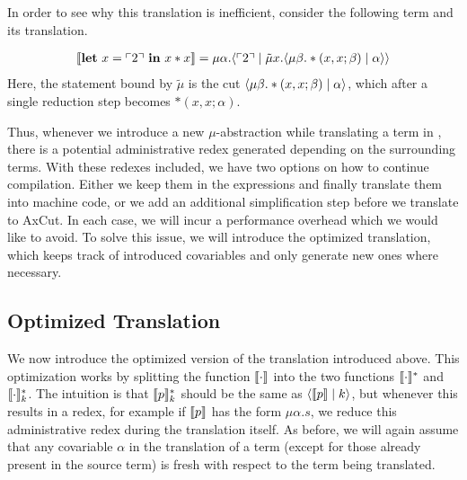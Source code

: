 In order to see why this translation is inefficient, consider the following term and its translation.
\begin{example}
  \label{ex:translation:naive}
  \begin{align*}
    \llbracket \mathbf{let}\ x = \ulcorner 2 \urcorner\ \mathbf{in}\ x*x \rrbracket = \mu\alpha.\langle \ulcorner 2 \urcorner \mid \tilde\mu x.\langle \mu\beta.*(x,x;\beta) \mid \alpha \rangle \rangle
  \end{align*}
  Here, the statement bound by $\tilde\mu$ is the cut $\langle \mu\beta.*(x,x;\beta) \mid \alpha \rangle$, which after a single reduction step becomes $*(x,x;\alpha)$.
\end{example}
Thus, whenever we introduce a new $\mu$-abstraction while translating a term in \surfacelang{}, there is a potential administrative redex generated  depending on the surrounding terms.
With these redexes included, we have two options on how to continue compilation.
Either we keep them in the expressions and finally translate them into machine code, or we add an additional simplification step before we translate \targetlang{} to AxCut.
In each case, we will incur a performance overhead which we would like to avoid.
To solve this issue, we will introduce the optimized translation, which keeps track of introduced covariables and only generate new ones where necessary.


\subsection{Optimized Translation}
\label{subsec:translation:optimized}
We now introduce the optimized version of the translation introduced above.
This optimization works by splitting the function $\llbracket \cdot \rrbracket$ into the two functions $\llbracket \cdot \rrbracket_{}^{\ast}$ and $\llbracket \cdot \rrbracket_{k}^{\ast}$.
The intuition is that $\llbracket p \rrbracket_{k}^{\ast}$ should be the same as $\langle \llbracket p \rrbracket \mid k \rangle$, but whenever this results in a redex, for example if $\llbracket p \rrbracket$ has the form $\mu \alpha.s$, we reduce this administrative redex during the translation itself.
As before, we will again assume that any covariable $\alpha$ in the translation of a term (except for those already present in the source term) is fresh with respect to the term being translated.

